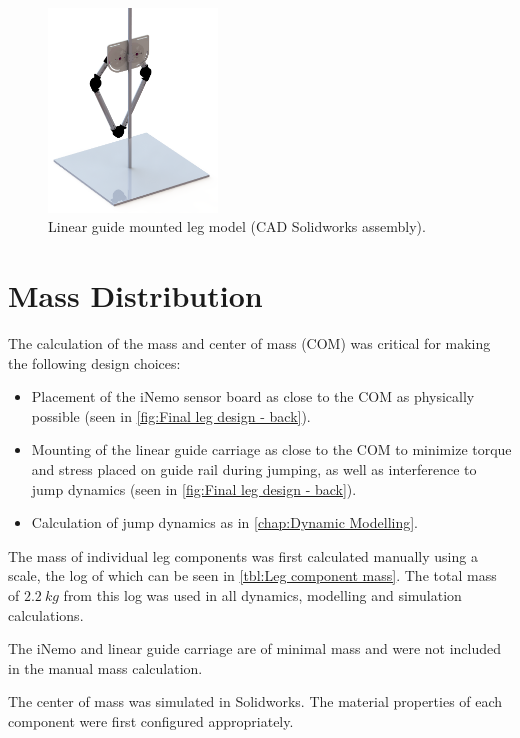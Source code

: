 \begin{figure}
\centering
\includegraphics[width=0.4\textwidth]{images/mechanical/back-shot.png} 
\caption{Linear guide mounted leg model (CAD Solidworks assembly).}
\label{fig:Linear guide mounted leg model}
\end{figure}

\section{Mass Distribution}

The calculation of the mass and center of mass (COM) was critical for making the following design choices:

\begin{itemize}
\item Placement of the iNemo sensor board as close to the COM as physically possible (seen in \cref{fig:Final leg design - back}).
\item Mounting of the linear guide carriage as close to the COM to minimize torque and stress placed on guide rail during jumping, as well as interference to jump dynamics (seen in \cref{fig:Final leg design - back}).
\item Calculation of jump dynamics as in \cref{chap:Dynamic Modelling}.
\end{itemize}

The mass of individual leg components was first calculated manually using a scale, the log of which can be seen in \cref{tbl:Leg component mass}. The total mass of $2.2\ kg$ from this log was used in all dynamics, modelling and simulation calculations. 

The iNemo and linear guide carriage are of minimal mass and were not included in the manual mass calculation.

The center of mass was simulated in Solidworks. The material properties of each component were first configured appropriately. 

